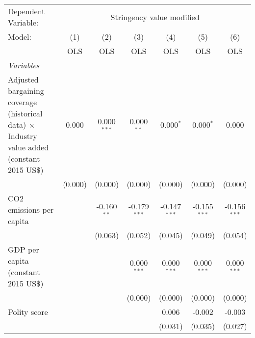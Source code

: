 
\begingroup
\centering
\begin{tabular}{lcccccc}
   \toprule
   Dependent Variable: & \multicolumn{6}{c}{Stringency value modified}\\
   Model:                                                                                              & (1)     & (2)           & (3)            & (4)            & (5)            & (6)\\  
                                                                                                       &  OLS    & OLS           & OLS            & OLS            & OLS            & OLS\\  
   \midrule
   \emph{Variables}\\
   Adjusted bargaining coverage (historical data) $\times$ Industry value added (constant 2015 US\$)   & 0.000   & 0.000$^{***}$ & 0.000$^{**}$   & 0.000$^{*}$    & 0.000$^{*}$    & 0.000\\   
                                                                                                       & (0.000) & (0.000)       & (0.000)        & (0.000)        & (0.000)        & (0.000)\\   
   CO2 emissions per capita                                                                            &         & -0.160$^{**}$ & -0.179$^{***}$ & -0.147$^{***}$ & -0.155$^{***}$ & -0.156$^{***}$\\   
                                                                                                       &         & (0.063)       & (0.052)        & (0.045)        & (0.049)        & (0.054)\\   
   GDP per capita (constant 2015 US\$)                                                                 &         &               & 0.000$^{***}$  & 0.000$^{***}$  & 0.000$^{***}$  & 0.000$^{***}$\\   
                                                                                                       &         &               & (0.000)        & (0.000)        & (0.000)        & (0.000)\\   
   Polity score                                                                                        &         &               &                & 0.006          & -0.002         & -0.003\\   
                                                                                                       &         &               &                & (0.031)        & (0.035)        & (0.027)\\   

\end{tabular}
